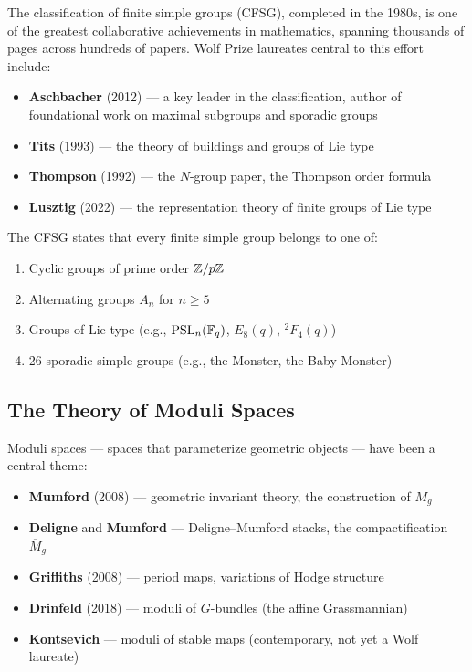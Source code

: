 The classification of finite simple groups (CFSG), completed in the 1980s, is one of the greatest collaborative achievements in mathematics, spanning thousands of pages across hundreds of papers. Wolf Prize laureates central to this effort include:
\begin{itemize}
    \item \textbf{Aschbacher} (2012) --- a key leader in the classification, author of foundational work on maximal subgroups and sporadic groups
    \item \textbf{Tits} (1993) --- the theory of buildings and groups of Lie type
    \item \textbf{Thompson} (1992) --- the $N$-group paper, the Thompson order formula
    \item \textbf{Lusztig} (2022) --- the representation theory of finite groups of Lie type
\end{itemize}

The CFSG states that every finite simple group belongs to one of:
\begin{enumerate}
    \item Cyclic groups of prime order $\mathbb{Z}/p\mathbb{Z}$
    \item Alternating groups $A_n$ for $n \geq 5$
    \item Groups of Lie type (e.g., $\operatorname{PSL}_n(\mathbb{F}_q)$, $E_8(q)$, $^2F_4(q)$)
    \item 26 sporadic simple groups (e.g., the Monster, the Baby Monster)
\end{enumerate}

\subsection{The Theory of Moduli Spaces}

Moduli spaces --- spaces that parameterize geometric objects --- have been a central theme:
\begin{itemize}
    \item \textbf{Mumford} (2008) --- geometric invariant theory, the construction of $M_g$
    \item \textbf{Deligne} and \textbf{Mumford} --- Deligne--Mumford stacks, the compactification $\overline{M}_g$
    \item \textbf{Griffiths} (2008) --- period maps, variations of Hodge structure
    \item \textbf{Drinfeld} (2018) --- moduli of $G$-bundles (the affine Grassmannian)
    \item \textbf{Kontsevich} --- moduli of stable maps (contemporary, not yet a Wolf laureate)
\end{itemize}

